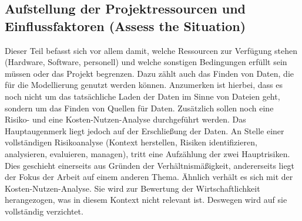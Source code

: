 \subsection{Aufstellung der Projektressourcen und Einflussfaktoren (Assess the Situation)} \label{subsec:assesTheSituation}
Dieser Teil befasst sich vor allem damit, welche Ressourcen zur Verfügung stehen (Hardware, Software, personell) und welche sonstigen Bedingungen erfüllt sein müssen oder das Projekt begrenzen. Dazu zählt auch das Finden von Daten, die für die Modellierung genutzt werden können. Anzumerken ist hierbei, dass es noch nicht um das tatsächliche Laden der Daten im Sinne von Dateien geht, sondern um das Finden von Quellen für Daten. Zusätzlich sollen noch eine Risiko- und eine Kosten-Nutzen-Analyse durchgeführt werden. Das Hauptaugenmerk liegt jedoch auf der Erschließung der Daten. 
\newline
An Stelle einer vollständigen Risikoanalyse (Kontext herstellen, Risiken identifizieren, analysieren, evaluieren, managen\citep[S.~43]{sowa_management_2017}), tritt eine Aufzählung der zwei Hauptrisiken. Dies geschieht einerseits aus Gründen der Verhältnismäßigkeit, andererseits liegt der Fokus der Arbeit auf einem anderen Thema. Ähnlich verhält es sich mit der Kosten-Nutzen-Analyse. Sie wird zur Bewertung der Wirtschaftlichkeit herangezogen, was in diesem Kontext nicht relevant ist. Deswegen wird auf sie vollständig verzichtet.

